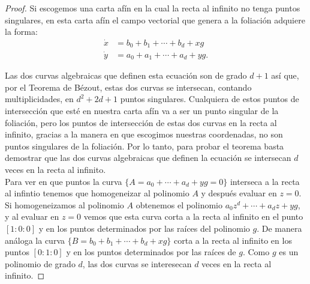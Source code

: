 \begin{proof}
Si escogemos una carta afín en la cual la recta al infinito no tenga puntos singulares, en esta carta afín el campo vectorial que genera a la foliación adquiere la forma:
\begin{equation*}
\begin{aligned}
\dot{x} &= b_{0}+b_{1}+\cdots+b_{d}+xg\\
\dot{y} &= a_{0}+a_{1}+\cdots+a_{d}+yg.
\end{aligned}
\end{equation*}

Las dos curvas algebraicas que definen esta ecuación son de grado $d+1$ así que, por el Teorema de Bézout, estas dos curvas se intersecan, contando multiplicidades,  en $d^{2}+2d+1$ puntos singulares. Cualquiera de estos puntos de intersección que esté en nuestra carta afín va a ser un punto singular de la foliación, pero los puntos de intersección de estas dos curvas en la recta al infinito, gracias a la manera en que escogimos nuestras coordenadas, no son puntos singulares de la foliación. Por lo tanto, para probar el teorema basta demostrar que las dos curvas algebraicas que definen la ecuación se intersecan $d$ veces en la recta al infinito.\\

Para ver en que puntos la curva $\{A=a_{0}+\cdots+a_{d}+yg=0\}$ interseca a la recta al infintio tenemos que homogeneizar al polinomio $A$ y después evaluar en $z=0$. Si homogeneizamos al polinomio $A$ obtenemos el polinomio $a_{0}z^{d}+\cdots+a_{d}z+yg$, y al evaluar en $z=0$ vemos que esta curva corta a la recta al infinito en el punto $[1:0:0]$ y en los puntos determinados por las raíces del polinomio $g$. De manera análoga la curva $\{B=b_{0}+b_{1}+\cdots+b_{d}+xg\}$ corta a la recta al infinito en los puntos $[0:1:0]$ y en los puntos determinados por las raíces de $g$. Como $g$ es un polinomio de grado $d$, las dos curvas se interesecan $d$ veces en la recta al infinito.

\end{proof}
